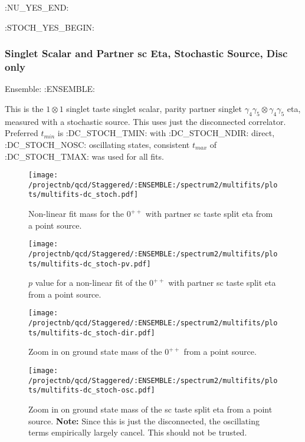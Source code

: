 \clearpage
:NU_YES_END:

:STOCH_YES_BEGIN:
\subsubsection{Singlet Scalar and Partner sc Eta, Stochastic Source, Disc only}

Ensemble: :ENSEMBLE:

This is the $1 \otimes 1$ singlet taste singlet scalar, parity partner singlet $\gamma_4 \gamma_5 \otimes \gamma_4 \gamma_5$ eta, measured with a stochastic source. This uses just the disconnected correlator. Preferred $t_{min}$ is :DC_STOCH_TMIN: with :DC_STOCH_NDIR: direct, :DC_STOCH_NOSC: oscillating states, consistent $t_{max}$ of :DC_STOCH_TMAX: was used for all fits.

\begin{multicols}{2}
\begin{figure}[H]
\centering
\texttt{[image: /projectnb/qcd/Staggered/:ENSEMBLE:/spectrum2/multifits/plots/multifits-dc\_stoch.pdf]}
\caption{Non-linear fit mass for the $0^{++}$ with partner sc taste split eta from a point source.}
\end{figure}
\columnbreak
\begin{figure}[H]
\centering
\texttt{[image: /projectnb/qcd/Staggered/:ENSEMBLE:/spectrum2/multifits/plots/multifits-dc\_stoch-pv.pdf]}
\caption{$p$ value for a non-linear fit of the $0^{++}$ with partner sc taste split eta from a point source.}
\end{figure}
\end{multicols}

\begin{multicols}{2}
\begin{figure}[H]
\centering
\texttt{[image: /projectnb/qcd/Staggered/:ENSEMBLE:/spectrum2/multifits/plots/multifits-dc\_stoch-dir.pdf]}
\caption{Zoom in on ground state mass of the $0^{++}$ from a point source.}
\end{figure}
\columnbreak
\begin{figure}[H]
\centering
\texttt{[image: /projectnb/qcd/Staggered/:ENSEMBLE:/spectrum2/multifits/plots/multifits-dc\_stoch-osc.pdf]}
\caption{Zoom in on ground state mass of the sc taste split eta from a point source. {\textbf{Note:}} Since this is just the disconnected, the oscillating terms empirically largely cancel. This should not be trusted.}
\end{figure}
\end{multicols}

